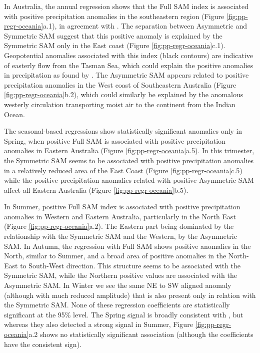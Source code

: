 \documentclass[smallextended]{svjour3}       %
\begin{document}
In Australia, the annual regression shows that the Full SAM index is associated with positive precipitation anomalies in the southeastern region (Figure \ref{fig:pp-regr-oceania}a.1), in agreement with \citet{gillett2006}. The separation between Asymmetric and Symmetric SAM suggest that this positive anomaly is explained by the Symmetric SAM only in the East coast (Figure \ref{fig:pp-regr-oceania}c.1). Geopotential anomalies associated with this index (black contours) are indicative of easterly flow from the Tasman Sea, which could explain the positive anomalies in precipitation as found by \citet{hendon2007}. The Asymmetric SAM appears related to positive precipitation anomalies in the West coast of Southeastern Australia (Figure \ref{fig:pp-regr-oceania}b.2), which could similarly be explained by the anomalous westerly circulation transporting moist air to the continent from the Indian Ocean.

The seasonal-based regressions show statistically significant anomalies only in Spring, when positive Full SAM is associated with positive precipitation anomalies in Eastern Australia (Figure \ref{fig:pp-regr-oceania}a.5). In this trimester, the Symmetric SAM seems to be associated with positive precipitation anomalies in a relatively reduced area of the East Coast (Figure \ref{fig:pp-regr-oceania}c.5) while the positive precipitation anomalies related with positive Asymmetric SAM affect all Eastern Australia (Figure \ref{fig:pp-regr-oceania}b.5).

In Summer, positive Full SAM index is associated with positive precipitation anomalies in Western and Eastern Australia, particularly in the North East (Figure \ref{fig:pp-regr-oceania}a.2). The Eastern part being dominated by the relationship with the Symmetric SAM and the Western, by the Asymmetric SAM. In Autumn, the regression with Full SAM shows positive anomalies in the North, similar to Summer, and a broad area of positive anomalies in the North-East to South-West direction. This structure seems to be associated with the Symmetric SAM, while the Northern positive values are associated with the Asymmetric SAM. In Winter we see the same NE to SW aligned anomaly (although with much reduced amplitude) that is also present only in relation with the Symmetric SAM. None of these regression coefficients are statistically significant at the 95\% level. The Spring signal is broadly consistent with \citet{hendon2007}, but whereas they also detected a strong signal in Summer, Figure \ref{fig:pp-regr-oceania}a.2 shows no statistically significant association (although the coefficients have the consistent sign).
\end{document}
